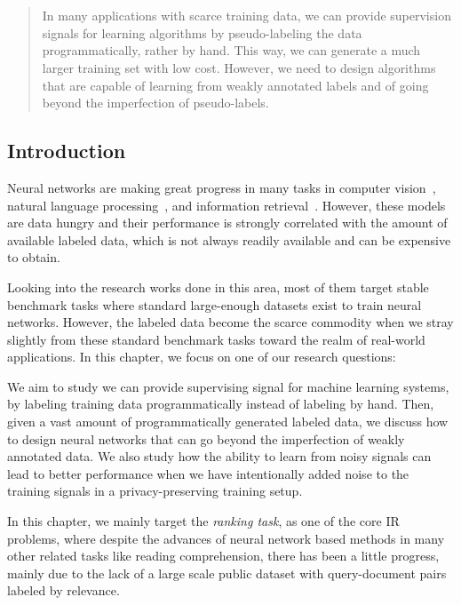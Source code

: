 \chapter{}
\label{chap:4}
%
\begin{quote}
In many applications with scarce training data, we can provide supervision signals for learning algorithms by pseudo-labeling the data programmatically, rather by hand. This way, we can generate a much larger training set with low cost. However, we need to design algorithms that are capable of learning from weakly annotated labels and of going beyond the imperfection of pseudo-labels. 
\end{quote}
%
\section{Introduction}
Neural networks are making great progress in many tasks in computer vision~\citep{krizhevsky2012imagenet}, natural language processing~\citep{collobert2008unified}, and information retrieval~\citep{welling2005exponential}. However, these models are data hungry and their performance is strongly correlated with the amount of available labeled data, which is not always readily available and can be expensive to obtain. 

Looking into the research works done in this area, most of them target stable benchmark tasks where standard large-enough datasets exist to train neural networks. However, the labeled data become the scarce commodity when we stray slightly from these standard benchmark tasks toward the realm of real-world applications. In this chapter, we focus on one of our research questions:

We aim to study we can provide supervising signal for machine learning systems, by labeling training data programmatically instead of labeling by hand. Then, given a vast amount of programmatically generated labeled data, we discuss how to design neural networks that can go beyond the imperfection of weakly annotated data. We also study how the ability to learn from noisy signals can lead to better performance when we have intentionally added noise to the training signals in a privacy-preserving training setup.

\medskip
In this chapter, we mainly target the \emph{ranking task}, as one of the core IR problems, where despite the advances of neural network based methods in many other related tasks like reading comprehension, there has been a little progress, mainly due to the lack of a large scale public dataset with query-document pairs labeled by relevance. 

